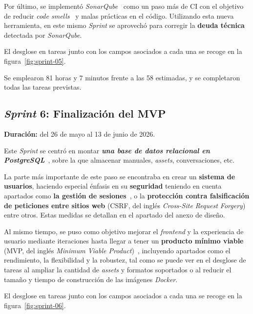 Por último, se implementó \textit{SonarQube}~\cite{sonarqube_ci} como un paso más de
\ac{CI} con el objetivo de
reducir \textit{code smells}~\cite{sonarqube_metrics} y malas prácticas en el código.
Utilizando esta nueva herramienta, en este mismo \textit{Sprint} se aprovechó para
corregir la \textbf{deuda técnica}~\cite{sonarqube_metrics} detectada por
\textit{SonarQube}.

El desglose en tareas junto con los campos asociados a cada una se
recoge en la figura~\ref{fig:sprint-05}.

Se emplearon 81 horas y 7 minutos frente a las 58 estimadas, y se
completaron todas las tareas previstas.

\subsection{\textit{Sprint} 6: Finalización del MVP}
\textbf{Duración:} del 26 de mayo al 13 de junio de 2026.

Este \textit{Sprint} se centró en montar \textbf{\textit{una base de datos relacional en
PostgreSQL}}~\cite{postgresql_about}, sobre la que almacenar manuales, \textit{assets},
conversaciones, etc.

La parte más importante de este paso se encontraba en crear un \textbf{sistema de usuarios},
haciendo especial énfasis en su \textbf{seguridad} teniendo en cuenta apartados
como \textbf{la gestión de sesiones}~\cite{owasp_session_management}, o la \textbf{protección
contra falsificación de peticiones entre sitios web} (\acs{CSRF}, del inglés \textit{Cross-Site
Request Forgery})~\cite{owasp_csrf} entre otros.
Estas medidas se detallan en el apartado
\guillemotleft{}\guillemotright{} del anexo de diseño.

Al mismo tiempo, se puso como objetivo mejorar el \textit{frontend} y la experiencia de
usuario mediante iteraciones hasta llegar a tener un \textbf{producto mínimo viable}
(\acs{MVP}, del inglés \textit{Minimum Viable Product})~\cite{agile_alliance_mvp}, incluyendo
apartados como el rendimiento, la flexibilidad y la robustez, tal como se puede ver en el
desglose de tareas al ampliar la cantidad de \textit{assets} y formatos soportados o al reducir
el tamaño y tiempo de construcción de las imágenes \textit{Docker}.

El desglose en tareas junto con los campos asociados a cada una se
recoge en la figura~\ref{fig:sprint-06}.


